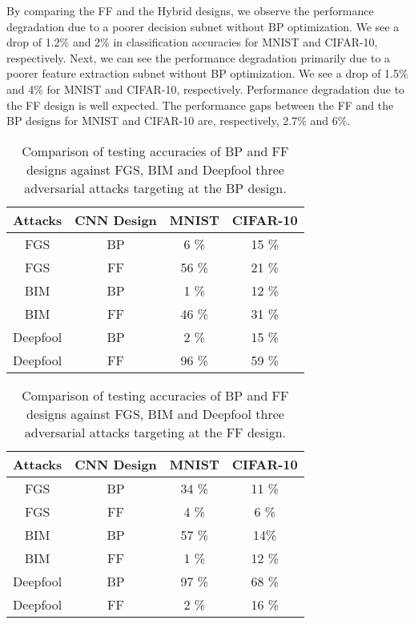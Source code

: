 \documentclass[preprint,12pt]{elsarticle}
\begin{document}
By comparing the FF and the Hybrid designs, we observe the performance
degradation due to a poorer decision subnet without BP optimization.
We see a drop of 1.2\% and 2\% in classification accuracies for MNIST
and CIFAR-10, respectively. Next, we can see the performance degradation
primarily due to a poorer feature extraction subnet without BP
optimization. We see a drop of 1.5\% and 4\% for MNIST and CIFAR-10,
respectively.  Performance degradation due to the FF design is well
expected.  The performance gaps between the FF and the BP designs for
MNIST and CIFAR-10 are, respectively, 2.7\% and 6\%. 

\begin{table}[htb]
\begin{center}
\begin{tabular}{|c|c|c|c|} \hline
Attacks & CNN Design    &  MNIST     & CIFAR-10   \\ \hline
FGS     & BP            &  6 \%      &   15 \%    \\ \hline
FGS     & FF            &  56 \%     &   21 \%    \\ \hline \hline
BIM     & BP            &  1 \%      &   12 \%    \\ \hline
BIM     & FF            &  46 \%     &   31 \%    \\ \hline \hline
Deepfool& BP            &  2 \%      &   15 \%    \\ \hline
Deepfool& FF            &  96 \%     &   59 \%    \\ \hline 
\end{tabular}
\end{center}
\caption{Comparison of testing accuracies of BP and FF designs against
FGS, BIM and Deepfool three adversarial attacks targeting at the BP design.} 
\label{table:robustness}
\end{table}

\begin{table}[htb]
\begin{center}
\begin{tabular}{|c|c|c|c|} \hline
Attacks & CNN Design &  MNIST  & CIFAR-10   \\ \hline
FGS     & BP         &  34 \%  &   11 \%    \\ \hline
FGS     & FF         &  4 \%   &   6  \%    \\ \hline \hline
BIM     & BP         &  57 \%  &   14\%     \\ \hline
BIM     & FF         &  1 \%   &   12 \%    \\ \hline \hline
Deepfool& BP         &  97 \%  &   68 \%    \\ \hline
Deepfool& FF         &  2 \%   &   16 \%    \\ \hline 
\end{tabular}
\end{center}
\caption{Comparison of testing accuracies of BP and FF designs against
FGS, BIM and Deepfool three adversarial attacks targeting at the FF design.} 
\label{table:robustness-2}
\end{table}
\end{document}

